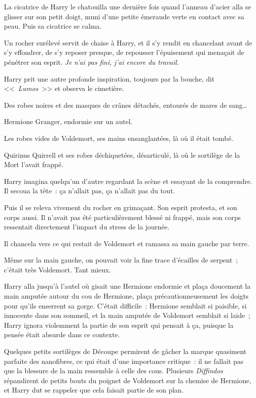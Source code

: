 La cicatrice de Harry le chatouilla une dernière fois quand l'anneau d'acier alla se glisser sur son petit doigt, muni d'une petite émeraude verte en contact avec sa peau. Puis sa cicatrice se calma.

Un rocher surélevé servit de chaise à Harry, et il s'y rendit en chancelant avant de s'y effondrer, de s'y reposer presque, de repousser l'épuisement qui menaçait de pénétrer son esprit. \emph{Je n'ai pas fini, j'ai encore du travail.}

Harry prit une autre profonde inspiration, toujours par la bouche, dit <<~\emph{Lumos}~>> et observa le cimetière.

Des robes noires et des masques de crânes détachés, entourés de mares de sang…

Hermione Granger, endormie sur un autel.

Les robes vides de Voldemort, ses mains ensanglantées, là où il était tombé.

Quirinus Quirrell et ses robes déchiquetées, désarticulé, là où le sortilège de la Mort l'avait frappé.

Harry imagina quelqu'un d'autre regardant la scène et essayant de la comprendre. Il secoua la tête~: ça n'allait pas, ça n'allait pas du tout.

Puis il se releva vivement du rocher en grimaçant. Son esprit protesta, et son corps aussi. Il n'avait pas été particulièrement blessé ni frappé, mais son corps ressentait directement l'impact du stress de la journée.

Il chancela vers ce qui restait de Voldemort et ramassa sa main gauche par terre.

Même sur la main gauche, on pouvait voir la fine trace d'écailles de serpent~; c'était très Voldemort. Tant mieux.

Harry alla jusqu'à l'autel où gisait une Hermione endormie et plaça doucement la main amputée autour du cou de Hermione, plaça précautionneusement les doigts pour qu'ils enserrent sa gorge. C'était difficile~: Hermione semblait si paisible, si innocente dans son sommeil, et la main amputée de Voldemort semblait si laide~; Harry ignora violemment la partie de son esprit qui pensait à ça, puisque la pensée était absurde dans ce contexte.

Quelques petits sortilèges de Découpe permirent de gâcher la marque quasiment parfaite des nanofibres, ce qui était d'une importance critique~: il ne fallait pas que la blessure de la main ressemble à celle des cous. Plusieurs \emph{Diffindos} répandirent de petits bouts du poignet de Voldemort sur la chemise de Hermione, et Harry dut se rappeler que cela faisait partie de son plan.

